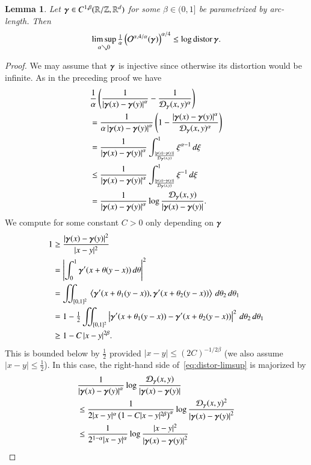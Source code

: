 \documentclass[a4paper,10pt,intlimits,ngerman]{amsart}
\newtheorem{lemma}[theorem]{Lemma}
\numberwithin{equation}{section}
\newcommand{\abs}[1]{\left | #1 \right |}
\DeclareMathOperator{\distor}{distor}
\begin{document}
\begin{lemma}
 Let ${\boldsymbol{\gamma}}\in C^{1,\beta}(\mathbb{R}/\mathbb{Z},\mathbb{R}^{d})$ for some $\beta\in(0,1]$
 be parametrized by arc-length. Then
 \[ \limsup_{\a\searrow0}\tfrac1\a\br{\E(\g)}^{\a/4} \le\log\distor\g. \]
\end{lemma}

\begin{proof}
 We may assume that ${\boldsymbol{\gamma}}$ is injective since otherwise its distortion
 would be infinite.
 As in the preceding proof we have
 \begin{align}\label{eq:distor-limsup}
  \begin{split}
  &\frac1\a\br{\frac1{\abs{\D}^{\a}}-\frac1{\mathcal{D}_{\g}(x,y)^{\a}}} \\
  &=\frac1{\a\abs{\D}^{\a}}\br{1-\frac{\abs{\D}^{\a}}{\mathcal{D}_{\g}(x,y)^{\a}}} \\
  &=\frac1{\abs{\D}^{\a}}\int_{\frac{\abs{\D}}{\mathcal{D}_{\g}(x,y)}}^{1}\xi^{\a-1}\d\xi \\
  &\le\frac1{\abs{\D}^{\a}}\int_{\frac{\abs{\D}}{\mathcal{D}_{\g}(x,y)}}^{1}\xi^{-1}\d\xi \\
  &=\frac1{\abs{\D}^{\a}} \log\frac{\mathcal{D}_{\g}(x,y)}{\abs{\D}}.
  \end{split}
 \end{align}
 We compute for some constant $C>0$ only depending on ${\boldsymbol{\gamma}}$
 \begin{align*}
  1&\ge\frac{\abs{\D}^{2}}{|x-y|^{2}}\\
  &=\abs{\int_{0}^{1}\dg(x+\theta (y-x))\d\theta}^{2} \\
  &=\iint_{[0,1]^{2}}{} \left \langle\dg(x+\theta_{1} (y-x)),\dg(x+\theta_{2} (y-x))\right \rangle\d\theta_{2}\d\theta_{1} \\
  &=1-\tfrac12\iint_{[0,1]^{2}}\abs{\dg(x+\theta_{1} (y-x))-\dg(x+\theta_{2} (y-x))}^{2}\d\theta_{2}\d\theta_{1} \\
  &\geq 1-C\, |x-y|^{2\beta}.
 \end{align*}
 This is bounded below by $\frac12$ provided $|x-y|\le (2C)^{-1/2\beta}$
 (we also assume $|x-y|\le\frac12$).
 In this case, the right-hand side of~\eqref{eq:distor-limsup} is
 majorized by
 \begin{align*}
 &\frac1{\abs{\D}^{\a}} \log\frac{\mathcal{D}_{\g}(x,y)}{\abs{\D}} \\
 &\le \frac1{2|x-y|^{\a}\br{1-C|x-y|^{2\beta}}^{\a}}\log\frac{\mathcal{D}_{\g}(x,y)^{2}}{\abs{\D}^{2}} \\
 &\le \frac1{2^{1-\a}|x-y|^{\a}}\log\frac{|x-y|^{2}}{\abs{\D}^{2}} \\

\end{align*}
\end{proof}
\end{document}
